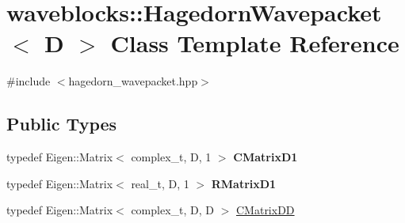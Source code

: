 \hypertarget{classwaveblocks_1_1_hagedorn_wavepacket}{}\section{waveblocks\+:\+:Hagedorn\+Wavepacket$<$ D $>$ Class Template Reference}
\label{classwaveblocks_1_1_hagedorn_wavepacket}


{\ttfamily \#include $<$hagedorn\+\_\+wavepacket.\+hpp$>$}

\subsection*{Public Types}
\begin{DoxyCompactItemize}
\item 
\hypertarget{classwaveblocks_1_1_hagedorn_wavepacket_a251e571828b08bafb78b894fa28e9678}{}typedef Eigen\+::\+Matrix$<$ complex\+\_\+t, D, 1 $>$ {\bfseries C\+Matrix\+D1}\label{classwaveblocks_1_1_hagedorn_wavepacket_a251e571828b08bafb78b894fa28e9678}

\item 
\hypertarget{classwaveblocks_1_1_hagedorn_wavepacket_a7a5e41136181dbba286042d153988164}{}typedef Eigen\+::\+Matrix$<$ real\+\_\+t, D, 1 $>$ {\bfseries R\+Matrix\+D1}\label{classwaveblocks_1_1_hagedorn_wavepacket_a7a5e41136181dbba286042d153988164}

\item 
typedef Eigen\+::\+Matrix$<$ complex\+\_\+t, D, D $>$ \hyperlink{classwaveblocks_1_1_hagedorn_wavepacket_af285e57872af93378e2fd77c5ab7f528}{C\+Matrix\+D\+D}
\end{DoxyCompactItemize}
